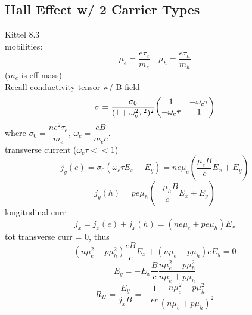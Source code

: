 \documentclass[UTF8]{ctexart} %
\numberwithin{equation}{section}
\begin{document}
\subsection{Hall Effect w/ 2 Carrier Types}
Kittel 8.3\\
mobilities:
\begin{equation}\label{key}
\mu_e = \dfrac{e\tau_e}{m_e} \quad \mu_h = \dfrac{e\tau_h}{m_h}
\end{equation}
($ m_e $ is eff mass)\\
Recall conductivity tensor w/ B-field
\begin{equation}\label{key}
\sigma = \dfrac{\sigma_0}{(1 + \omega_c^2\tau^2)^2} 
		\mqty(1 & -\omega_c\tau\\
			  -\omega_c\tau & 1)
\end{equation}
where $ \sigma_0 = \dfrac{n e^2 \tau_e}{m_e}$, $ \omega_c = \dfrac{eB}{m_e c} $.\\
transverse current ($ \omega_c\tau << 1 $)
\begin{equation}\label{key}
j_y(e) = \sigma_0(\omega_c\tau E_x + E_y) = n e \mu_e (\dfrac{\mu_e B}{c}E_x + E_y)
\end{equation}
\begin{equation}\label{key}
j_y(h) = p e \mu_h (\dfrac{-\mu_h B}{c}E_x + E_y)
\end{equation}
longitudinal curr
\begin{equation}\label{key}
j_x = j_x(e) + j_x(h) = (n e \mu_e + p e \mu_h)E_x
\end{equation}
tot transverse curr = 0, thus
\begin{equation}\label{key}
(n\mu_e^2 - p\mu_h^2)\dfrac{eB}{c} E_x + (n\mu_e + p\mu_h)e E_y = 0
\end{equation}
\begin{equation}\label{key}
E_y = -E_x \dfrac{B}{c}\dfrac{n\mu_e^2 - p\mu_h^2}{n\mu_e + p\mu_h}
\end{equation}
\begin{equation}\label{key}
R_H = \dfrac{E_y}{j_x B} = -\dfrac{1}{e c}\dfrac{n\mu_e^2 - p\mu_h^2}{(n\mu_e + p\mu_h)^2}
\end{equation}
\end{document}
